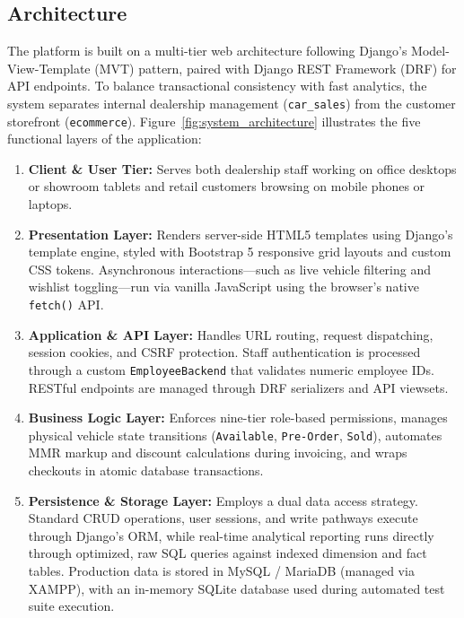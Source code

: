 \subsection{Architecture}                                                    
The platform is built on a multi-tier web architecture following Django's Model-View-Template (MVT) pattern, paired with Django REST Framework (DRF) for API endpoints. To balance transactional consistency with fast analytics, the system separates internal dealership     
  management (\texttt{car\_sales}) from the customer storefront (\texttt{ecommerce}).                        
    Figure~\ref{fig:system_architecture} illustrates the five functional layers of the application:
    \begin{enumerate}
        \item \textbf{Client \& User Tier:} Serves both dealership staff working on office desktops or showroom tablets and retail customers
  browsing on mobile phones or laptops.
        \item \textbf{Presentation Layer:} Renders server-side HTML5 templates using Django's template engine, styled with Bootstrap 5
  responsive grid layouts and custom CSS tokens. Asynchronous interactions—such as live vehicle filtering and wishlist toggling—run via     
  vanilla JavaScript using the browser's native \texttt{fetch()} API.                                                                       
        \item \textbf{Application \& API Layer:} Handles URL routing, request dispatching, session cookies, and CSRF protection. Staff
  authentication is processed through a custom \texttt{EmployeeBackend} that validates numeric employee IDs. RESTful endpoints are managed  
  through DRF serializers and API viewsets.                                                                                                 
        \item \textbf{Business Logic Layer:} Enforces nine-tier role-based permissions, manages physical vehicle state transitions
  (\texttt{Available}, \texttt{Pre-Order}, \texttt{Sold}), automates MMR markup and discount calculations during invoicing, and wraps       
  checkouts in atomic database transactions.                                                                                                
        \item \textbf{Persistence \& Storage Layer:} Employs a dual data access strategy. Standard CRUD operations, user sessions, and write
  pathways execute through Django's ORM, while real-time analytical reporting runs directly through optimized, raw SQL queries against      
  indexed dimension and fact tables. Production data is stored in MySQL / MariaDB (managed via XAMPP), with an in-memory SQLite database    
  used during automated test suite execution.                                                                                               
    \end{enumerate}
    
